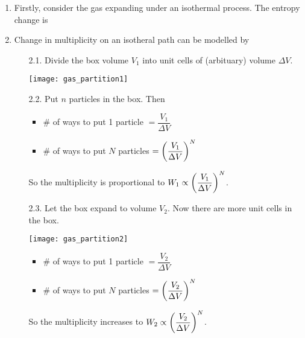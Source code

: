 \documentclass[class=article, crop=false, 12pt]{standalone}
\begin{document}
\begin{enumerate}
    \item Firstly, consider the gas expanding under an isothermal process.
    The entropy change is

    \item Change in multiplicity on an isotheral path can be modelled by
    \begin{enumerate}
        \item[2.1.] Divide the box volume $V_1$ into unit cells of (arbituary) volume $\Delta V$.
        \begin{center}
            \begin{minipage}{0.4\linewidth}
                \centering
                \texttt{[image: gas\_partition1]}
            \end{minipage}
        \end{center}

        \item[2.2.] Put $n$ particles in the box. Then
        \begin{itemize}
            \item \# of ways to put 1 particle $=\dfrac{V_1}{\Delta V}$
            \item \# of ways to put $N$ particles $=\qty(\dfrac{V_1}{\Delta V})^N$
        \end{itemize}
        So the multiplicity is proportional to $W_1 \propto \qty(\dfrac{V_1}{\Delta V})^N$.

        \item[2.3.] Let the box expand to volume $V_2$. 
        Now there are more unit cells in the box.
        \begin{center}
            \begin{minipage}{0.5\linewidth}
                \centering
                \texttt{[image: gas\_partition2]}
            \end{minipage}
        \end{center}
        \begin{itemize}
            \item \# of ways to put 1 particle $=\dfrac{V_2}{\Delta V}$
            \item \# of ways to put $N$ particles $=\qty(\dfrac{V_2}{\Delta V})^N$
        \end{itemize}
        So the multiplicity increases to $W_2 \propto \qty(\dfrac{V_2}{\Delta V})^N$.
    \end{enumerate}


\end{enumerate}
\end{document}
